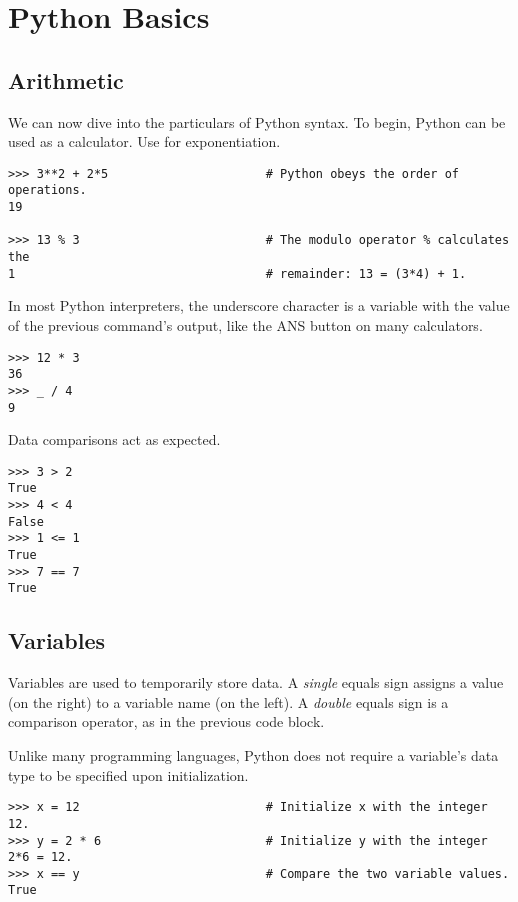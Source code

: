 \section*{Python Basics}

\subsection*{Arithmetic}
We can now dive into the particulars of Python syntax.
To begin, Python can be used as a calculator.
Use \li{**} for exponentiation.

\begin{lstlisting}
>>> 3**2 + 2*5                      # Python obeys the order of operations.
19

>>> 13 % 3                          # The modulo operator % calculates the
1                                   # remainder: 13 = (3*4) + 1. 
\end{lstlisting}
In most Python interpreters, the underscore character \li{\_} is a variable with the value of the previous command's output, like the ANS button on many calculators.

\begin{lstlisting}
>>> 12 * 3
36
>>> _ / 4
9
\end{lstlisting}

Data comparisons act as expected.
\begin{lstlisting}
>>> 3 > 2
True
>>> 4 < 4
False
>>> 1 <= 1
True
>>> 7 == 7
True
\end{lstlisting}

\subsection*{Variables}
Variables are used to temporarily store data.
A \emph{single} equals sign assigns a value (on the right) to a variable name (on the left).
A \emph{double} equals sign is a comparison operator, as in the previous code block.

Unlike many programming languages, Python does not require a variable's data type to be specified upon initialization.

\begin{lstlisting}
>>> x = 12                          # Initialize x with the integer 12.
>>> y = 2 * 6                       # Initialize y with the integer 2*6 = 12.
>>> x == y                          # Compare the two variable values.
True
\end{lstlisting}
\begin{comment} %
# The 'is' operator checks for object equality. For two variables a and b,
# a 'is' b if a and b refer to the same data at the same location
# in memory. For example, even though x and y have the same numerical value,
# they are not the same object because x is an integer and y is a float,
# meaning they're stored at different locations in memory.
>>> x is y
False                   
\end{comment}

